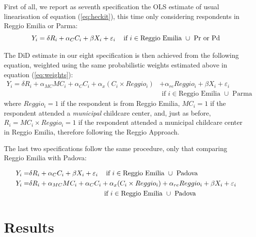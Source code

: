\documentclass[12pt]{article}
\begin{document}
First of all, we report as seventh specification the OLS estimate of usual linearisation of equation (\ref{eq:heckit}), this time only considering respondents in Reggio Emilia or Parma:
\begin{equation}
Y_{i} = \delta R_{i} + \alpha_{C} C_{i} + \beta X_{i} + \varepsilon_{i}    \hspace{2ex} \text{ if } i \in \text{Reggio Emilia } \cup \text{ Pr or Pd} \label{eq7:OLSrepr}
\end{equation}

\medskip

The DiD estimate in our eight specification is then achieved from the following equation, weighted using the same probabilistic weights estimated above in equation (\ref{eq:weights}):
\begin{align}
Y_{i} = \delta R_{i} + \alpha_{MC} MC_{i} + \alpha_{C} C_{i} + \alpha_{x} (C_{i} \times Reggio_{i}) &+  \alpha_{re} Reggio_{i} + \beta X_{i} + \varepsilon_{i} \nonumber \\
   & \text{ if } i \in \text{Reggio Emilia } \cup \text{ Parma} \label{eq8:didpr}
\end{align} 
%
where $Reggio_{i}=1$ if the respondent is from Reggio Emilia, $MC_{i}=1$ if the respondent attended a \textit{municipal} childcare center, and, just as before, $R_{i}=MC_{i} \times Reggio_{i}=1$ if the respondent attended a municipal childcare center in Reggio Emilia, therefore following the Reggio Approach.

\medskip

The last two specifications follow the same procedure, only that comparing Reggio Emilia with Padova:

\begin{align}
Y_{i} =& \delta R_{i} + \alpha_{C} C_{i} + \beta X_{i} + \varepsilon_{i}    \hspace{2ex} \text{ if } i \in \text{Reggio Emilia } \cup \text{ Padova} \label{eq9:OLSrepd} \\
Y_{i} =& \delta R_{i} + \alpha_{MC} MC_{i} + \alpha_{C} C_{i} + \alpha_{x} (C_{i} \times Reggio_{i}) +  \alpha_{re} Reggio_{i} + \beta X_{i} + \varepsilon_{i} \nonumber \\
& \hspace{25ex} \text{ if } i \in \text{Reggio Emilia } \cup \text{ Padova} \label{eq10:didpd}
\end{align}


\section{Results}
\end{document}
